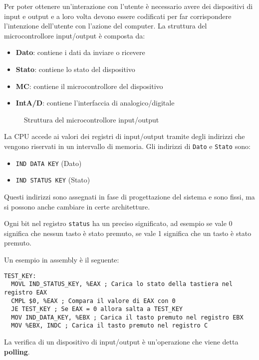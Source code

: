 \documentclass[a4paper]{article}
\theoremstyle{break}
\theoremstyle{break}
\theoremstyle{break}
\theoremstyle{break}
\begin{document}
\noindent Per poter ottenere un'interazione con l'utente è necessario avere dei dispositivi
di input e output e a loro volta devono essere codificati per far corrispondere
l'intenzione dell'utente con l'azione del computer. La struttura del microcontrollore
input/output è composta da:
\begin{itemize}
	\item \textbf{Dato}: contiene i dati da inviare o ricevere
	\item \textbf{Stato}: contiene lo stato del dispositivo
	\item \textbf{MC}: contiene il microcontrollore del dispositivo
	\item \textbf{IntA/D}: contiene l'interfaccia di analogico/digitale
\end{itemize}
\begin{figure}[H]
	\centering
	\caption{Struttura del microcontrollore input/output}
\end{figure}

\noindent La CPU accede ai valori dei registri di input/output tramite degli indirizzi
che vengono riservati in un intervallo di memoria. Gli indirizzi di \texttt{Dato} e
\texttt{Stato} sono:
\begin{itemize}
	\item \texttt{IND DATA KEY} (Dato)
	\item \texttt{IND STATUS KEY} (Stato)
\end{itemize}
Questi indirizzi sono assegnati in fase di progettazione del sistema e sono fissi,
ma si possono anche cambiare in certe architetture.

\vspace{1em}
\noindent Ogni bit nel registro \texttt{status} ha un preciso significato, ad esempio
se vale 0 significa che nessun tasto è stato premuto, se vale 1 significa che un tasto
è stato premuto.

\vspace{1em}
\noindent Un esempio in assembly è il seguente:
\begin{lstlisting}[language={[x86masm]Assembler}]
 TEST_KEY:
  MOVL IND_STATUS_KEY, %EAX ; Carica lo stato della tastiera nel registro EAX
  CMPL $0, %EAX ; Compara il valore di EAX con 0
  JE TEST_KEY ; Se EAX = 0 allora salta a TEST_KEY
  MOV IND_DATA_KEY, %EBX ; Carica il tasto premuto nel registro EBX
  MOV %EBX, INDC ; Carica il tasto premuto nel registro C
\end{lstlisting}
\noindent La verifica di un dispositivo di input/output è un'operazione che viene detta
\textbf{polling}.
\end{document}
